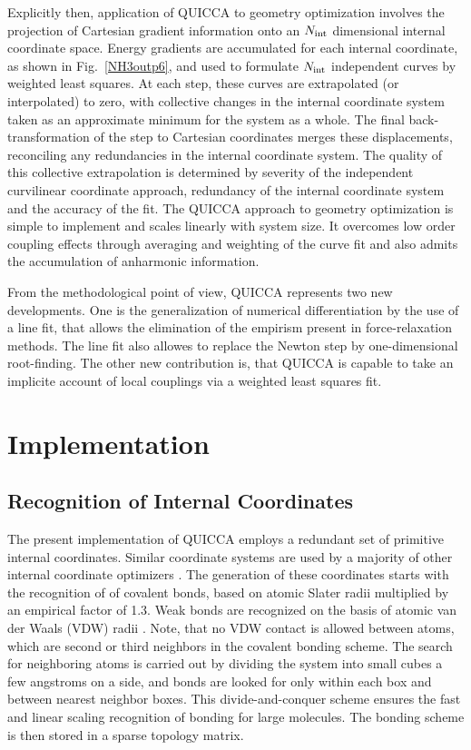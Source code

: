 \documentclass[prl,twocolumn,showpacs,twocolumngrid,superbib]{revtex4}
\begin{document}
Explicitly then, application of QUICCA to geometry optimization involves the  projection of Cartesian 
gradient information onto an 
$N_{\rm int}$ dimensional internal coordinate space.  Energy gradients 
are accumulated for each internal coordinate, as shown in Fig.~\ref{NH3outp6}, and used to formulate 
$N_{\rm int}$ independent curves by weighted least squares.  At each step, these curves are extrapolated 
(or interpolated) to zero, with collective changes in the internal coordinate system taken as an approximate 
minimum for the system as a whole. The final back-transformation of the step to Cartesian coordinates merges 
these displacements, reconciling any redundancies in the internal coordinate system. The quality of this 
collective extrapolation is determined by severity of 
the independent curvilinear coordinate approach,
redundancy of the internal 
coordinate system and the accuracy of the fit.  The QUICCA approach to geometry optimization is simple to 
implement and scales linearly with system size.  It overcomes low order coupling effects through averaging and 
weighting of the curve fit and also admits the accumulation of anharmonic information.  

From the methodological point of view, QUICCA represents two new developments.
One is the generalization of numerical differentiation by the use of a line fit, that
allows the elimination of the empirism present in force-relaxation methods. The
line fit also allowes to replace the Newton step by one-dimensional root-finding.
The other new contribution is, that QUICCA is capable to take an implicite 
account of local couplings via a weighted least squares fit.

\section{Implementation}

\subsection{Recognition of Internal Coordinates} \label{recognition}

The present implementation of QUICCA employs a redundant set of primitive internal 
coordinates. Similar coordinate systems are used by a majority of other internal coordinate optimizers 
\cite{bakerstest,eckert,Pulay_natural_internals,fogarasi_diaghess,schlegel_on2iter}.  
The generation of these coordinates starts with the recognition of of covalent bonds, 
based on atomic Slater radii \cite{SlaterRad}  multiplied by an empirical factor of 1.3. 
Weak bonds are recognized on the basis of atomic van der Waals (VDW) radii \cite{JMOLtable}.
Note, that no VDW contact is allowed between atoms, which are second or third neighbors in the 
covalent bonding scheme.  The search for neighboring atoms is carried out by dividing 
the system into small cubes a few angstroms on a side, and bonds are looked for only within 
each box and between nearest neighbor boxes.  This divide-and-conquer scheme ensures the fast 
and linear scaling recognition of bonding for large molecules. The bonding scheme is then 
stored in a sparse topology matrix.
\end{document}
